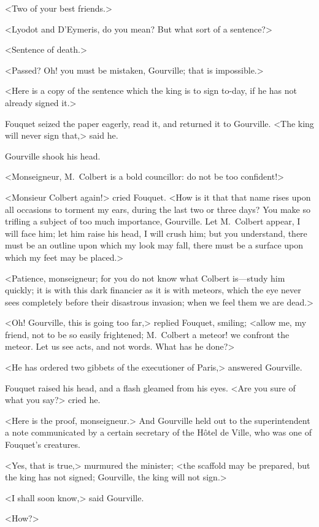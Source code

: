 <Two of your best friends.>

<Lyodot and D'Eymeris, do you mean? But what sort of a sentence?>

<Sentence of death.>

<Passed? Oh! you must be mistaken, Gourville; that is impossible.>

<Here is a copy of the sentence which the king is to sign to-day, if he has not already signed it.>

Fouquet seized the paper eagerly, read it, and returned it to Gourville. <The king will never sign that,> said he.

Gourville shook his head.

<Monseigneur, M.~Colbert is a bold councillor: do not be too confident!>

<Monsieur Colbert again!> cried Fouquet. <How is it that that name rises upon all occasions to torment my ears, during the last two or three days? You make so trifling a subject of too much importance, Gourville. Let M.~Colbert appear, I will face him; let him raise his head, I will crush him; but you understand, there must be an outline upon which my look may fall, there must be a surface upon which my feet may be placed.>

<Patience, monseigneur; for you do not know what Colbert is—study him quickly; it is with this dark financier as it is with meteors, which the eye never sees completely before their disastrous invasion; when we feel them we are dead.>

<Oh! Gourville, this is going too far,> replied Fouquet, smiling; <allow me, my friend, not to be so easily frightened; M.~Colbert a meteor!  we confront the meteor. Let us see acts, and not words. What has he done?>

<He has ordered two gibbets of the executioner of Paris,> answered Gourville.

Fouquet raised his head, and a flash gleamed from his eyes. <Are you sure of what you say?> cried he.

<Here is the proof, monseigneur.> And Gourville held out to the superintendent a note communicated by a certain secretary of the Hôtel de Ville, who was one of Fouquet's creatures.

<Yes, that is true,> murmured the minister; <the scaffold may be prepared, but the king has not signed; Gourville, the king will not sign.>

<I shall soon know,> said Gourville.

<How?>

